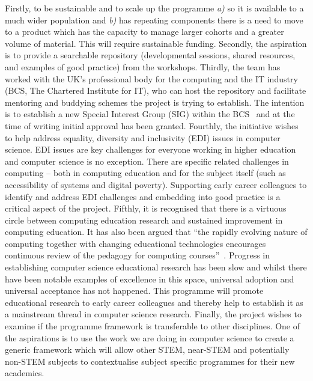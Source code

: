 \documentclass[sigconf]{acmart}
\begin{document}
Firstly, to be sustainable and to scale up the programme {\emph{a)}}
so it is available to a much wider population and {\emph{b)}} has
repeating components there is a need to move to a product which has
the capacity to manage larger cohorts and a greater volume of
material. This will require sustainable funding. Secondly, the
aspiration is to provide a searchable repository (developmental
sessions, shared resources, and examples of good practice) from the
workshops. Thirdly, the team has worked with the UK's professional
body for the computing and the IT industry (BCS, The Chartered
Institute for IT), who can host the repository and facilitate
mentoring and buddying schemes the project is trying to establish. The
intention is to establish a new Special Interest Group (SIG) within
the BCS~\cite{BCSSIG} and at the time of writing initial approval has
been granted. Fourthly, the initiative wishes to help address
equality, diversity and inclusivity (EDI) issues in computer
science. EDI issues are key challenges for everyone working in higher
education and computer science is no exception. There are specific
related challenges in computing -- both in computing education and for
the subject itself (such as accessibility of systems and digital
poverty). Supporting early career colleagues to identify and address
EDI challenges and embedding into good practice is a critical aspect
of the project. Fifthly, it is recognised that there is a virtuous
circle between computing education research and sustained improvement
in computing education. It has also been argued that ``the rapidly
evolving nature of computing together with changing educational
technologies encourages continuous review of the pedagogy for
computing courses''~\cite{Iroms2004}. Progress in establishing
computer science educational research has been slow and whilst there
have been notable examples of excellence in this space, universal
adoption and universal acceptance has not happened. This programme
will promote educational research to early career colleagues and
thereby help to establish it as a mainstream thread in computer
science research. Finally, the project wishes to examine if the
programme framework is transferable to other disciplines. One of the
aspirations is to use the work we are doing in computer science to
create a generic framework which will allow other STEM, near-STEM and
potentially non-STEM subjects to contextualise subject specific
programmes for their new academics.
\end{document}
